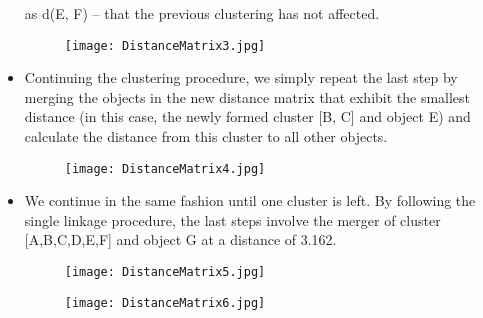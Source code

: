 \documentclass[a4paper,12pt]{article}
\begin{document}
\begin{itemize}
as d(E, F) – that the previous clustering has not affected.
\begin{figure}[h!]
\begin{center}
  \texttt{[image: DistanceMatrix3.jpg]}\\
\end{center}
\end{figure}
\item Continuing the clustering procedure, we simply repeat the last step by merging
the objects in the new distance matrix that exhibit the smallest distance (in this case,
the newly formed cluster [B, C] and object E) and calculate the distance from this
cluster to all other objects.
\begin{figure}[h!]
\begin{center}
  \texttt{[image: DistanceMatrix4.jpg]}\\
\end{center}
\end{figure}
\item We continue in the same fashion until one cluster is left. By following the single linkage procedure, the last steps involve the merger
of cluster [A,B,C,D,E,F] and object G at a distance of 3.162.
\begin{figure}[h!]
\begin{center}
  \texttt{[image: DistanceMatrix5.jpg]}\\
\end{center}
\end{figure}
\begin{figure}[h!]
\begin{center}
  \texttt{[image: DistanceMatrix6.jpg]}\\
\end{center}
\end{figure}
\end{itemize}
\newpage
\end{document}
